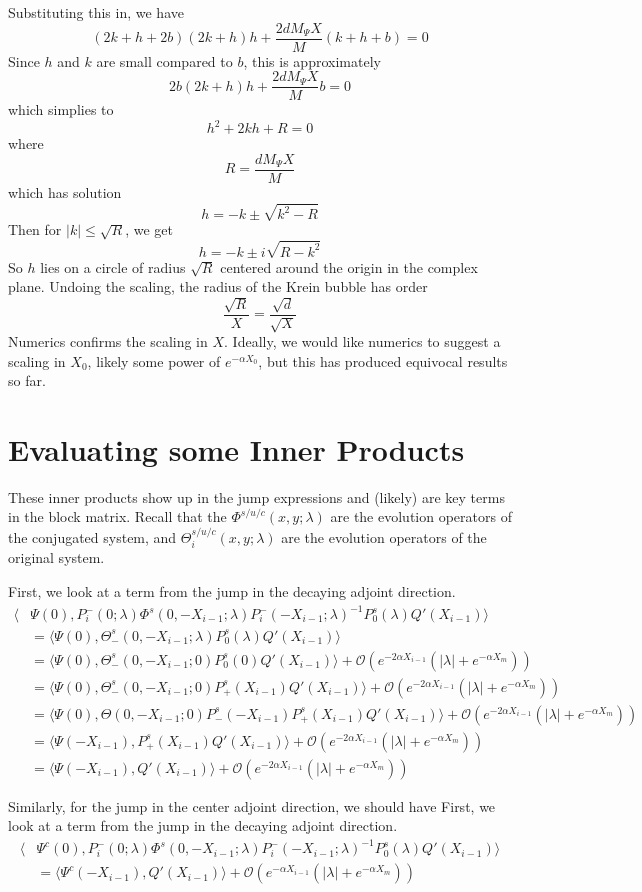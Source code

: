\documentclass[thesis.tex]{subfiles}
\begin{document}
Substituting this in, we have
\[
(2k + h + 2b)(2k + h) h + \frac{2 d M_\Psi X}{M}(k + h + b) = 0
\]
Since $h$ and $k$ are small compared to $b$, this is approximately
\[
2b (2 k + h) h + \frac{2 d M_\Psi X}{M}b = 0
\]
which simplies to
\[
h^2 + 2kh + R = 0
\]
where
\[
R = \frac{d M_\Psi X}{M}
\]
which has solution
\[
h = -k \pm \sqrt{k^2 - R}
\]
Then for $|k| \leq \sqrt{R}$, we get
\[
h = -k \pm i \sqrt{R - k^2}
\]
So $h$ lies on a circle of radius $\sqrt{R}$ centered around the origin in the complex plane. Undoing the scaling, the radius of the Krein bubble has order
\[
\frac{\sqrt{R}}{X} = \frac{\sqrt{d}}{\sqrt{X}}
\] 
Numerics confirms the scaling in $X$. Ideally, we would like numerics to suggest a scaling in $X_0$, likely some power of $e^{-\alpha X_0}$, but this has produced equivocal results so far.

\section{Evaluating some Inner Products}

These inner products show up in the jump expressions and (likely) are key terms in the block matrix. Recall that the $\Phi^{s/u/c}(x, y; \lambda)$ are the evolution operators of the conjugated system, and $\Theta_i^{s/u/c}(x, y; \lambda)$ are the evolution operators of the original system.

First, we look at a term from the jump in the decaying adjoint direction.
\begin{align*}
\langle &\Psi(0), P_i^-(0; \lambda) \Phi^s(0, -X_{i-1}; \lambda) P_i^-(-X_{i-1}; \lambda)^{-1} P_0^s(\lambda) Q'(X_{i-1})\rangle \\
&= \langle \Psi(0), \Theta_-^s(0, -X_{i-1}; \lambda) P_0^s(\lambda) Q'(X_{i-1})\rangle \\
&= \langle \Psi(0), \Theta_-^s(0, -X_{i-1}; 0) P_0^s(0) Q'(X_{i-1})\rangle + \mathcal{O}(e^{-2\alpha X_{i-1}}(|\lambda| + e^{-\alpha X_m})) \\
&= \langle \Psi(0), \Theta_-^s(0, -X_{i-1}; 0) P^s_+(X_{i-1}) Q'(X_{i-1})\rangle + \mathcal{O}(e^{-2\alpha X_{i-1}}(|\lambda| + e^{-\alpha X_m})) \\
&= \langle \Psi(0), \Theta(0, -X_{i-1}; 0) P^s_-(-X_{i-1}) P^s_+(X_{i-1}) Q'(X_{i-1})\rangle + \mathcal{O}(e^{-2\alpha X_{i-1}}(|\lambda| + e^{-\alpha X_m})) \\
&= \langle \Psi(-X_{i-1}), P^s_+(X_{i-1}) Q'(X_{i-1})\rangle + \mathcal{O}(e^{-2\alpha X_{i-1}}(|\lambda| + e^{-\alpha X_m})) \\
&= \langle \Psi(-X_{i-1}), Q'(X_{i-1})\rangle + \mathcal{O}(e^{-2\alpha X_{i-1}}(|\lambda| + e^{-\alpha X_m})) 
\end{align*}

Similarly, for the jump in the center adjoint direction, we should have
First, we look at a term from the jump in the decaying adjoint direction.
\begin{align*}
\langle &\Psi^c(0), P_i^-(0; \lambda) \Phi^s(0, -X_{i-1}; \lambda) P_i^-(-X_{i-1}; \lambda)^{-1} P_0^s(\lambda) Q'(X_{i-1})\rangle \\
&= \langle \Psi^c(-X_{i-1}), Q'(X_{i-1})\rangle + \mathcal{O}(e^{-\alpha X_{i-1}}(|\lambda| + e^{-\alpha X_m}))
\end{align*}
\end{document}
